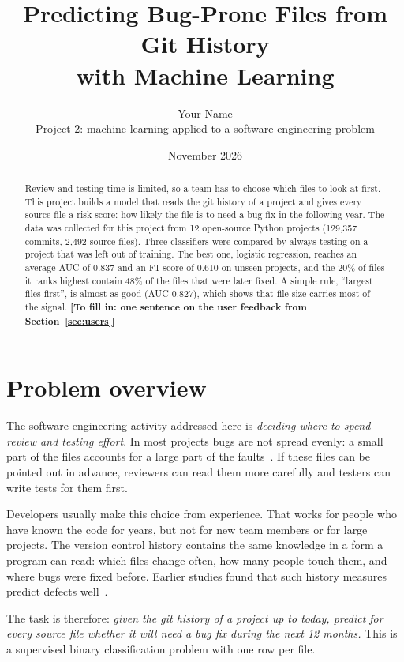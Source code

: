 \documentclass[11pt,a4paper]{article}
\title{Predicting Bug-Prone Files from Git History\\with Machine Learning}
\author{Your Name\\ \small Project 2: machine learning applied to a software engineering problem}
\date{November 2026}
\newcommand{\todo}[1]{\textbf{[To fill in: #1]}}
\begin{document}
\maketitle

\begin{abstract}
\noindent Review and testing time is limited, so a team has to choose which
files to look at first. This project builds a model that reads the git history
of a project and gives every source file a risk score: how likely the file is
to need a bug fix in the following year. The data was collected for this
project from 12 open-source Python projects (129,357 commits, 2,492 source
files). Three classifiers were compared by always testing on a project that
was left out of training. The best one, logistic regression, reaches an
average AUC of 0.837 and an F1 score of 0.610 on unseen projects, and the 20\%
of files it ranks highest contain 48\% of the files that were later fixed.
A simple rule, ``largest files first'', is almost as good (AUC 0.827), which
shows that file size carries most of the signal.
\todo{one sentence on the user feedback from Section~\ref{sec:users}}
\end{abstract}

\section{Problem overview}

The software engineering activity addressed here is \emph{deciding where to
spend review and testing effort}. In most projects bugs are not spread evenly:
a small part of the files accounts for a large part of the
faults~\cite{ostrand}. If these files can be pointed out in advance, reviewers
can read them more carefully and testers can write tests for them first.

Developers usually make this choice from experience. That works for people who
have known the code for years, but not for new team members or for large
projects. The version control history contains the same knowledge in a form a
program can read: which files change often, how many people touch them, and
where bugs were fixed before. Earlier studies found that such history measures
predict defects well~\cite{nagappan,moser}.

The task is therefore: \emph{given the git history of a project up to today,
predict for every source file whether it will need a bug fix during the next
12 months.} This is a supervised binary classification problem with one row
per file.
\end{document}
